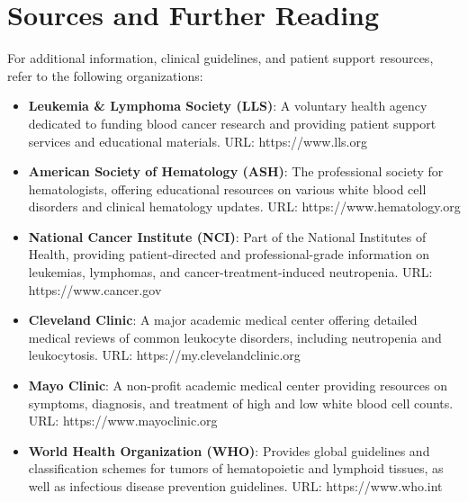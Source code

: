 \section*{Sources and Further Reading}
For additional information, clinical guidelines, and patient support resources, refer to the following organizations:
\begin{itemize}
  \item \textbf{Leukemia \& Lymphoma Society (LLS)}: A voluntary health agency dedicated to funding blood cancer research and providing patient support services and educational materials. URL: https://www.lls.org
  \item \textbf{American Society of Hematology (ASH)}: The professional society for hematologists, offering educational resources on various white blood cell disorders and clinical hematology updates. URL: https://www.hematology.org
  \item \textbf{National Cancer Institute (NCI)}: Part of the National Institutes of Health, providing patient-directed and professional-grade information on leukemias, lymphomas, and cancer-treatment-induced neutropenia. URL: https://www.cancer.gov
  \item \textbf{Cleveland Clinic}: A major academic medical center offering detailed medical reviews of common leukocyte disorders, including neutropenia and leukocytosis. URL: https://my.clevelandclinic.org
  \item \textbf{Mayo Clinic}: A non-profit academic medical center providing resources on symptoms, diagnosis, and treatment of high and low white blood cell counts. URL: https://www.mayoclinic.org
  \item \textbf{World Health Organization (WHO)}: Provides global guidelines and classification schemes for tumors of hematopoietic and lymphoid tissues, as well as infectious disease prevention guidelines. URL: https://www.who.int
\end{itemize}